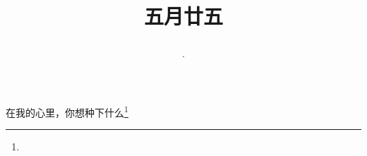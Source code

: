 \title{\date[d=30,m=6,y=2024][year:cn-y,年,month:cn,day:cn,日,·,weekday]·五月廿五 }
在我的心里，你想种下什么\footnote{ }

